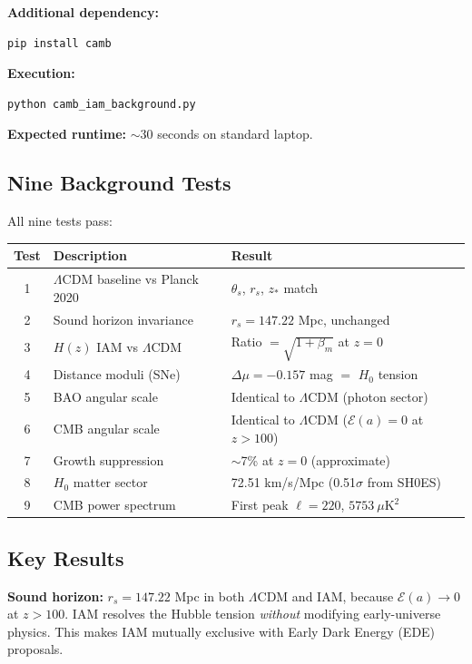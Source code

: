 \documentclass[11pt]{article}
\begin{document}
\textbf{Additional dependency:}
\begin{lstlisting}[language=bash]
pip install camb
\end{lstlisting}

\textbf{Execution:}
\begin{lstlisting}[language=bash]
python camb_iam_background.py
\end{lstlisting}

\textbf{Expected runtime:} $\sim$30 seconds on standard laptop.

\subsection{Nine Background Tests}

All nine tests pass:

\begin{center}
\begin{tabular}{clp{5.5cm}}
\toprule
\textbf{Test} & \textbf{Description} & \textbf{Result} \\
\midrule
1 & $\Lambda$CDM baseline vs Planck 2020 & $\theta_s$, $r_s$, $z_*$ match \\
2 & Sound horizon invariance & $r_s = 147.22$ Mpc, unchanged \\
3 & $H(z)$ IAM vs $\Lambda$CDM & Ratio $= \sqrt{1 + \beta_m}$ at $z=0$ \\
4 & Distance moduli (SNe) & $\Delta\mu = -0.157$ mag $=$ $H_0$ tension \\
5 & BAO angular scale & Identical to $\Lambda$CDM (photon sector) \\
6 & CMB angular scale & Identical to $\Lambda$CDM ($\mathcal{E}(a) = 0$ at $z > 100$) \\
7 & Growth suppression & $\sim$7\% at $z=0$ (approximate) \\
8 & $H_0$ matter sector & 72.51 km/s/Mpc (0.51$\sigma$ from SH0ES) \\
9 & CMB power spectrum & First peak $\ell = 220$, $5753~\mu\text{K}^2$ \\
\bottomrule
\end{tabular}
\end{center}

\subsection{Key Results}

\textbf{Sound horizon:} $r_s = 147.22$ Mpc in both $\Lambda$CDM and IAM, because $\mathcal{E}(a) \to 0$ at $z > 100$. IAM resolves the Hubble tension \textit{without} modifying early-universe physics. This makes IAM mutually exclusive with Early Dark Energy (EDE) proposals.
\end{document}
